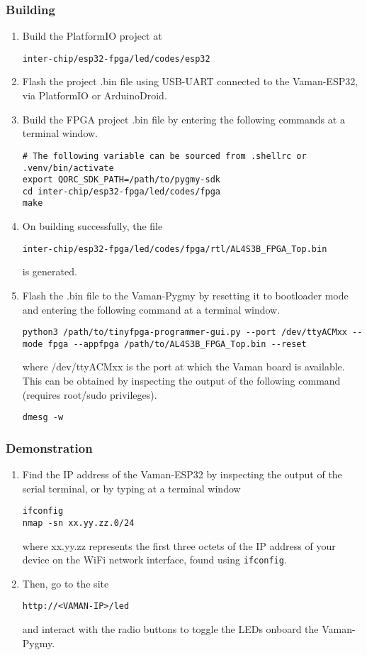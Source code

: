 \subsubsection{Building}
\begin{enumerate}
    \item Build the PlatformIO project at
    \begin{lstlisting}
inter-chip/esp32-fpga/led/codes/esp32
    \end{lstlisting}
    \item Flash the project .bin file using USB-UART connected to the 
    Vaman-ESP32, via PlatformIO or ArduinoDroid.
    \item Build the FPGA project .bin file by entering the following commands at
    a terminal window.
    \begin{lstlisting}
# The following variable can be sourced from .shellrc or .venv/bin/activate
export QORC_SDK_PATH=/path/to/pygmy-sdk
cd inter-chip/esp32-fpga/led/codes/fpga
make
    \end{lstlisting}
    \item On building successfully, the file
    \begin{lstlisting}
inter-chip/esp32-fpga/led/codes/fpga/rtl/AL4S3B_FPGA_Top.bin
    \end{lstlisting}
    is generated.
    \item Flash the .bin file to the Vaman-Pygmy by resetting it to bootloader
    mode and entering the following command at a terminal window.
    \begin{lstlisting}
python3 /path/to/tinyfpga-programmer-gui.py --port /dev/ttyACMxx --mode fpga --appfpga /path/to/AL4S3B_FPGA_Top.bin --reset
    \end{lstlisting}
    where /dev/ttyACMxx is the port at which the Vaman board is available. This
    can be obtained by inspecting the output of the following command (requires
    root/sudo privileges).
    \begin{lstlisting}
dmesg -w
    \end{lstlisting}
\end{enumerate}

\subsubsection{Demonstration}
\begin{enumerate}
    \item Find the IP address of the Vaman-ESP32 by inspecting the output of the
    serial terminal, or by typing at a terminal window
    \begin{lstlisting}
ifconfig
nmap -sn xx.yy.zz.0/24
    \end{lstlisting}
    where xx.yy.zz represents the first three octets of the IP address of your
    device on the WiFi network interface, found using \texttt{ifconfig}.
    \item Then, go to the site
    \begin{lstlisting}
http://<VAMAN-IP>/led
    \end{lstlisting}
    and interact with the radio buttons to toggle the LEDs onboard the
    Vaman-Pygmy. 
\end{enumerate}

